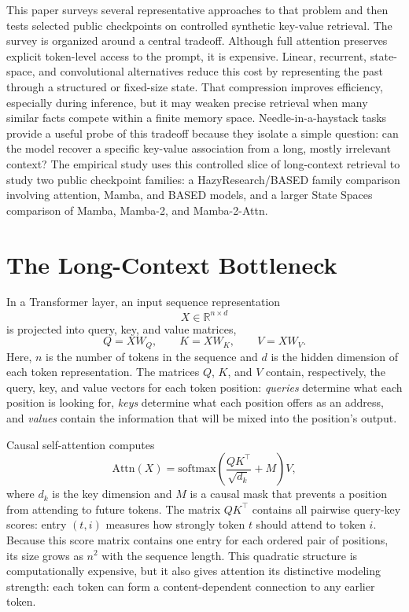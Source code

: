 \documentclass[10pt]{article}
\begin{document}
This paper surveys several representative approaches to that problem and then
tests selected public checkpoints on controlled synthetic key-value retrieval. The survey is
organized around a central tradeoff. Although full attention preserves explicit
token-level access to the prompt, it is expensive. Linear, recurrent,
state-space, and convolutional alternatives reduce this cost by representing
the past through a structured or fixed-size state. That compression improves
efficiency, especially during inference, but it may weaken precise retrieval
when many similar facts compete within a finite memory space. Needle-in-a-haystack tasks provide
a useful probe of this tradeoff because they isolate a simple question: can the
model recover a specific key-value association from a long, mostly irrelevant
context? The empirical study uses this controlled slice of long-context
retrieval to study two public checkpoint families: a HazyResearch/BASED family
comparison involving attention, Mamba, and BASED models, and a larger State
Spaces comparison of Mamba, Mamba-2, and Mamba-2-Attn.

\section{The Long-Context Bottleneck}

In a Transformer layer, an input sequence representation
\[
X \in \mathbb{R}^{n \times d}
\]
is projected into query, key, and value matrices,
\[
Q=XW_Q,\qquad K=XW_K,\qquad V=XW_V.
\]
Here, \(n\) is the number of tokens in the sequence and \(d\) is the hidden
dimension of each token representation. The matrices \(Q\), \(K\), and \(V\)
contain, respectively, the query, key, and value vectors for each token position:
\textit{queries} determine what each position is looking for, \textit{keys} determine what each
position offers as an address, and \textit{values} contain the information that will be
mixed into the position's output.

Causal self-attention computes
\[
\mathrm{Attn}(X)=
\mathrm{softmax}\!\left(\frac{QK^\top}{\sqrt{d_k}} + M\right)V,
\]
where \(d_k\) is the key dimension and \(M\) is a causal mask that prevents a
position from attending to future tokens. The matrix \(QK^\top\) contains all
pairwise query-key scores: entry \((t,i)\) measures how strongly token \(t\)
should attend to token \(i\). Because this score matrix contains one entry for
each ordered pair of positions, its size grows as \(n^2\) with the sequence
length. This quadratic structure is computationally expensive, but it also
gives attention its distinctive modeling strength: each token can form a
content-dependent connection to any earlier token.
\end{document}
